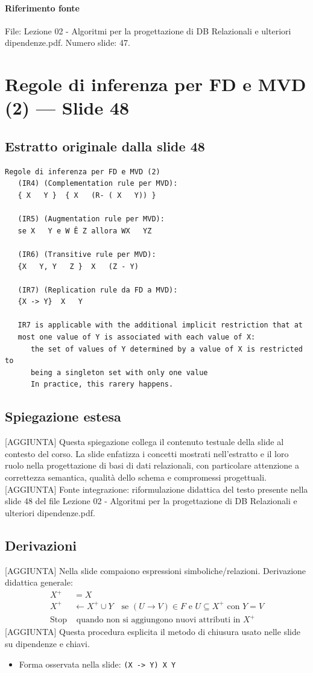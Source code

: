 \documentclass[11pt]{article}
\begin{document}
\paragraph{Riferimento fonte} File: Lezione 02 - Algoritmi per la progettazione di DB Relazionali e ulteriori dipendenze.pdf. Numero slide: 47.
\section{Regole di inferenza per FD e MVD (2) --- Slide 48}
\subsection*{Estratto originale dalla slide 48}
\begin{lstlisting}
Regole di inferenza per FD e MVD (2)
   (IR4) (Complementation rule per MVD):
   { X   Y }  { X   (R- ( X   Y)) }

   (IR5) (Augmentation rule per MVD):
   se X   Y e W Ê Z allora WX   YZ

   (IR6) (Transitive rule per MVD):
   {X   Y, Y   Z }  X   (Z - Y)

   (IR7) (Replication rule da FD a MVD):
   {X -> Y}  X   Y

   IR7 is applicable with the additional implicit restriction that at
   most one value of Y is associated with each value of X:
      the set of values of Y determined by a value of X is restricted to
      being a singleton set with only one value
      In practice, this rarery happens.
\end{lstlisting}
\subsection*{Spiegazione estesa}
[AGGIUNTA] Questa spiegazione collega il contenuto testuale della slide al contesto del corso. La slide enfatizza i concetti mostrati nell'estratto e il loro ruolo nella progettazione di basi di dati relazionali, con particolare attenzione a correttezza semantica, qualità dello schema e compromessi progettuali.
[AGGIUNTA] Fonte integrazione: riformulazione didattica del testo presente nella slide 48 del file Lezione 02 - Algoritmi per la progettazione di DB Relazionali e ulteriori dipendenze.pdf.
\subsection*{Derivazioni}
[AGGIUNTA] Nella slide compaiono espressioni simboliche/relazioni. Derivazione didattica generale:
\begin{align*}
X^+ &= X \\
X^+ &\leftarrow X^+ \cup Y \quad \text{se } (U \to V) \in F \text{ e } U \subseteq X^+ \text{ con } Y=V \\
\text{Stop} &\text{ quando non si aggiungono nuovi attributi in } X^+
\end{align*}
[AGGIUNTA] Questa procedura esplicita il metodo di chiusura usato nelle slide su dipendenze e chiavi.
\begin{itemize}[leftmargin=*]
\item Forma osservata nella slide: \texttt{(X -> Y)  X   Y}
\end{itemize}
\end{document}
